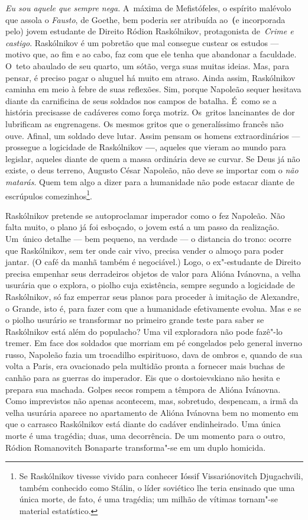 \emph{Eu sou aquele que sempre nega.} A~máxima de Mefistófeles, o
espírito malévolo que assola o \emph{Fausto}, de Goethe, bem poderia ser
atribuída ao~\textbf{(}e incorporada pelo) jovem estudante de Direito
Ródion Raskólnikov, protagonista de~\emph{Crime e castigo}. Raskólnikov
é um pobretão que mal consegue custear os estudos --- motivo que, ao fim
e ao cabo, faz com que ele tenha que abandonar a faculdade. O~teto
abaulado de seu quarto, um sótão, verga suas muitas ideias. Mas, para
pensar, é preciso pagar o aluguel há muito em atraso. Ainda assim,
Raskólnikov caminha em meio à febre de suas reflexões. Sim, porque
Napoleão sequer hesitava diante da carnificina de seus soldados nos
campos de batalha. É~como se a história precisasse de cadáveres como
força motriz. Os~gritos lancinantes de dor lubrificam as engrenagens. Os
mesmos gritos que o generalíssimo francês não ouve. Afinal, um soldado
deve lutar. Assim pensam os homens extraordinários --- prossegue a
logicidade de Raskólnikov \textbf{---}, aqueles que vieram ao mundo para
legislar, aqueles diante de quem a massa ordinária deve se curvar. Se
Deus já não existe, o deus terreno, Augusto César Napoleão, não deve se
importar com o \emph{não matarás}. Quem tem algo a dizer para a
humanidade não pode estacar diante de escrúpulos comezinhos\footnote{Se
  Raskólnikov tivesse vivido para conhecer Ióssif Vissariónovitch
  Djugachvili, também conhecido como Stálin, o líder soviético lhe teria
  ensinado que uma única morte, de fato, é uma tragédia; um milhão de
  vítimas tornam"-se material estatístico.}.

Raskólnikov pretende se autoproclamar imperador como o fez Napoleão. Não
falta muito, o plano já foi esboçado, o jovem está a um passo da
realização. Um~único detalhe --- bem pequeno, na verdade --- o distancia
do trono: ocorre que Raskólnikov, sem ter onde cair vivo, precisa vender
o almoço para poder jantar. (O café da manhã também é negociável.) Logo,
o ex"-estudante de Direito precisa empenhar seus derradeiros objetos de
valor para Alióna Ivánovna, a velha usurária que o explora, o piolho
cuja existência, sempre segundo a logicidade de Raskólnikov, só faz
emperrar seus planos para proceder à imitação de Alexandre, o Grande,
isto é, para fazer com que a humanidade efetivamente evolua. Mas e se o
piolho usurário se transformar no primeiro grande teste para saber se
Raskólnikov está além do populacho? Uma vil exploradora não pode fazê"-lo
tremer. Em face dos soldados que morriam em pé congelados pelo general
inverno russo, Napoleão fazia um trocadilho espirituoso, dava de ombros
e, quando de sua volta a Paris, era ovacionado pela multidão pronta a
fornecer mais buchas de canhão para as guerras do imperador. Eis que o
dostoievskiano não hesita e prepara sua machada. Golpes secos rompem a
têmpora de Alióna Ivánovna. Como imprevistos não apenas acontecem, mas,
sobretudo, despencam, a irmã da velha usurária aparece no apartamento de
Alióna Ivánovna bem no momento em que o carrasco Raskólnikov está diante
do cadáver endinheirado. Uma única morte é uma tragédia; duas, uma
decorrência. De um momento para o outro, Ródion Romanovitch Bonaparte
transforma"-se em um duplo homicida.

